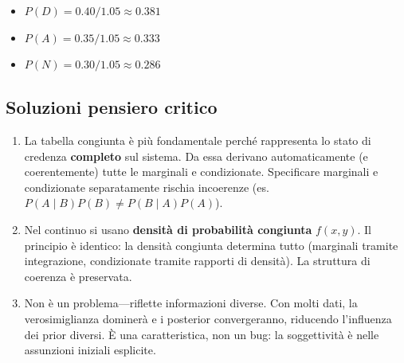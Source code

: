 \documentclass[
  italian,
  letterpaper,
  a4paper,
  11pt,
  open=any]{scrbook}
\providecommand{\tightlist}{%
  \setlength{\itemsep}{0pt}\setlength{\parskip}{0pt}}
\theoremstyle{plain}
\theoremstyle{definition}
\theoremstyle{definition}
\theoremstyle{remark}
\begin{document}
\begin{tcolorbox}
\begin{enumerate}
  \begin{itemize}
  \tightlist
  \item
    \(P(D) = 0.40 / 1.05 ≈ 0.381\)
  \item
    \(P(A) = 0.35 / 1.05 ≈ 0.333\)
  \item
    \(P(N) = 0.30 / 1.05 ≈ 0.286\)
  \end{itemize}
\end{enumerate}

\subsection{Soluzioni pensiero
critico}\label{soluzioni-pensiero-critico}

\begin{enumerate}
\def\labelenumi{\arabic{enumi}.}
\setcounter{enumi}{12}
\item
  La tabella congiunta è più fondamentale perché rappresenta lo stato di
  credenza \textbf{completo} sul sistema. Da essa derivano
  automaticamente (e coerentemente) tutte le marginali e condizionate.
  Specificare marginali e condizionate separatamente rischia incoerenze
  (es. \(P(A \mid B) P(B) \neq P(B \mid A) P(A)\)).
\item
  Nel continuo si usano \textbf{densità di probabilità congiunta}
  \(f(x, y)\). Il principio è identico: la densità congiunta determina
  tutto (marginali tramite integrazione, condizionate tramite rapporti
  di densità). La struttura di coerenza è preservata.
\item
  Non è un problema---riflette informazioni diverse. Con molti dati, la
  verosimiglianza dominerà e i posterior convergeranno, riducendo
  l'influenza dei prior diversi. È una caratteristica, non un bug: la
  soggettività è nelle assunzioni iniziali esplicite.
\end{enumerate}

\end{tcolorbox}
\end{document}

